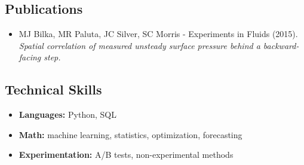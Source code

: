 \documentclass[10pt,letterpaper]{article}
\begin{document}
\begin{paracol}{2}
\begin{rightcolumn}
\begin{itemize}[label={--}, leftmargin={.15in}, rightmargin={.2in}]
    \end{itemize}

\subsection*{Publications}

    \begin{itemize}[label={--}, leftmargin={.15in}, rightmargin={.2in}]
    	\parskip=0.1em

    	\item
    		MJ Bilka, MR Paluta, JC Silver, SC Morris - Experiments in Fluids (2015). \emph{Spatial correlation of measured unsteady surface pressure behind a backward-facing step.}

    \end{itemize}

\subsection*{Technical Skills}

    \begin{itemize}[label={--}, leftmargin={.15in}, rightmargin={.2in}]
    	\parskip=0.1em
        \item
    	\textbf{Languages:} Python, SQL
    	\item
    	\textbf{Math:} machine learning, statistics, optimization, forecasting
            \item
    	\textbf{Experimentation:} A/B tests, non-experimental methods

    \end{itemize}

\end{rightcolumn}
\end{paracol}
\end{document}
